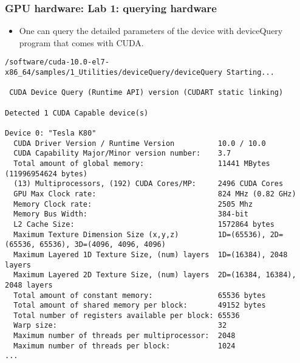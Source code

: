 \begin{frame}[fragile]
  \frametitle{GPU hardware: Lab 1: querying hardware}
\begin{itemize}
\item One can query the detailed parameters of the device with {\color{mycolorcli}deviceQuery} program that comes with CUDA.
\end{itemize}
{\tiny
{\color{mycolorcli}
\begin{verbatim}
/software/cuda-10.0-el7-x86_64/samples/1_Utilities/deviceQuery/deviceQuery Starting...

 CUDA Device Query (Runtime API) version (CUDART static linking)

Detected 1 CUDA Capable device(s)

Device 0: "Tesla K80"
  CUDA Driver Version / Runtime Version          10.0 / 10.0
  CUDA Capability Major/Minor version number:    3.7
  Total amount of global memory:                 11441 MBytes (11996954624 bytes)
  (13) Multiprocessors, (192) CUDA Cores/MP:     2496 CUDA Cores
  GPU Max Clock rate:                            824 MHz (0.82 GHz)
  Memory Clock rate:                             2505 Mhz
  Memory Bus Width:                              384-bit
  L2 Cache Size:                                 1572864 bytes
  Maximum Texture Dimension Size (x,y,z)         1D=(65536), 2D=(65536, 65536), 3D=(4096, 4096, 4096)
  Maximum Layered 1D Texture Size, (num) layers  1D=(16384), 2048 layers
  Maximum Layered 2D Texture Size, (num) layers  2D=(16384, 16384), 2048 layers
  Total amount of constant memory:               65536 bytes
  Total amount of shared memory per block:       49152 bytes
  Total number of registers available per block: 65536
  Warp size:                                     32
  Maximum number of threads per multiprocessor:  2048
  Maximum number of threads per block:           1024
...
\end{verbatim}
}
}

\end{frame}


